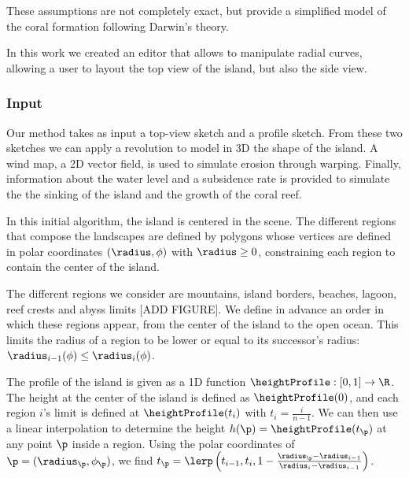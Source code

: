 These assumptions are not completely exact, but provide a simplified model of the coral formation following Darwin's theory.

In this work we created an editor that allows to manipulate radial curves, allowing a user to layout the top view of the island, but also the side view.


\subsubsection{Input}
Our method takes as input a top-view sketch and a profile sketch. From these two sketches we can apply a revolution to model in 3D the shape of the island. A wind map, a 2D vector field, is used to simulate erosion through warping. Finally, information about the water level and a subsidence rate is provided to simulate the the sinking of the island and the growth of the coral reef.

In this initial algorithm, the island is centered in the scene. The different regions that compose the landscapes are defined by polygons whose vertices are defined in polar coordinates $(\radius, \phi)$ with $\radius \geq 0$, constraining each region to contain the center of the island. 

The different regions we consider are mountains, island borders, beaches, lagoon, reef crests and abyss limits [ADD FIGURE]. We define in advance an order in which these regions appear, from the center of the island to the open ocean. This limits the radius of a region to be lower or equal to its successor's radius: $\radius_{i-1}(\phi) \leq \radius_{i}(\phi)$. 

The profile of the island is given as a 1D function $\heightProfile: [0, 1] \to \R$. The height at the center of the island is defined as $\heightProfile(0)$, and each region $i$'s limit is defined at $\heightProfile(t_i)$ with $t_i = \frac{i}{n - 1}$. We can then use a linear interpolation to determine the height $h(\p) = \heightProfile(t_{\p})$ at any point $\p$ inside a region. Using the polar coordinates of $\p = (\radius_{\p}, \phi_{\p})$, we find $t_\p = \lerp \left( t_{i-1}, t_i, 1 - \frac{\radius_{\p} - \radius_{i-1}}{\radius_i - \radius_{i-1}} \right)$.

